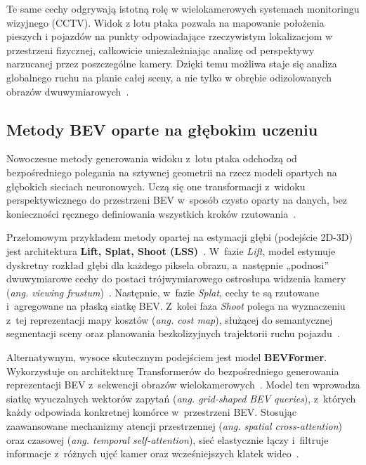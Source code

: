 Te same cechy odgrywają istotną rolę w wielokamerowych systemach monitoringu wizyjnego (CCTV).
Widok z lotu ptaka pozwala na mapowanie położenia pieszych i pojazdów na punkty odpowiadające
rzeczywistym lokalizacjom w przestrzeni fizycznej, całkowicie uniezależniając analizę od
perspektywy narzucanej przez poszczególne kamery. Dzięki temu możliwa staje się analiza globalnego
ruchu na planie całej sceny, a nie tylko w obrębie odizolowanych obrazów
dwuwymiarowych~\cite{fleuret2008}.

\subsection{Metody BEV oparte na głębokim uczeniu}

Nowoczesne metody generowania widoku z~lotu ptaka odchodzą od bezpośredniego polegania na sztywnej
geometrii na rzecz modeli opartych na głębokich sieciach neuronowych. Uczą się one transformacji
z~widoku perspektywicznego do przestrzeni BEV w~sposób czysto oparty na danych, bez konieczności
ręcznego definiowania wszystkich kroków rzutowania~\cite{li2023}.

Przełomowym przykładem metody opartej na estymacji głębi (podejście 2D-3D) jest architektura
\textbf{Lift, Splat, Shoot (LSS)}~\cite{philion2020}. W~fazie \textit{Lift}, model estymuje
dyskretny rozkład głębi dla każdego piksela obrazu, a~następnie „podnosi” dwuwymiarowe cechy do
postaci trójwymiarowego ostrosłupa widzenia kamery (\textit{ang. viewing frustum})~\cite{zhao2024}.
Następnie, w~fazie \textit{Splat}, cechy te są rzutowane i~agregowane na płaską siatkę BEV. Z~kolei
faza \textit{Shoot} polega na wyznaczeniu z~tej reprezentacji mapy kosztów (\textit{ang. cost
  map}), służącej do semantycznej segmentacji sceny oraz planowania bezkolizyjnych trajektorii ruchu
pojazdu~\cite{philion2020, zhao2024}.

Alternatywnym, wysoce skutecznym podejściem jest model \textbf{BEVFormer}. Wykorzystuje on
architekturę Transformerów do bezpośredniego generowania reprezentacji BEV z~sekwencji obrazów
wielokamerowych~\cite{li2022bevformer}. Model ten wprowadza siatkę wyuczalnych wektorów zapytań
(\textit{ang. grid-shaped BEV queries}), z~których każdy odpowiada konkretnej komórce w~przestrzeni
BEV. Stosując zaawansowane mechanizmy atencji przestrzennej (\textit{ang. spatial cross-attention})
oraz czasowej (\textit{ang. temporal self-attention}), sieć elastycznie łączy i~filtruje informacje
z~różnych ujęć kamer oraz wcześniejszych klatek wideo~\cite{li2022bevformer}.

